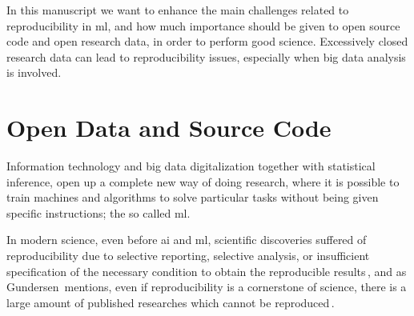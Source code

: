 In this manuscript we want to enhance the main challenges related to reproducibility
in \ac{ml}, and how much importance should be given to open source
code and open research data, in order to perform good science.
Excessively closed research data can lead to reproducibility issues,
especially when big data analysis is involved.

\section{Open Data and Source Code}
%
Information technology and big data digitalization together with statistical inference,
open up a complete new way of doing research, where it is possible to train machines
and algorithms to solve particular tasks without being given specific instructions; the so called
\ac{ml}.

In modern science, even before \ac{ai} and \ac{ml}, scientific discoveries suffered of reproducibility due
to selective reporting, selective analysis, or insufficient specification of the necessary condition to obtain the
reproducible results\,\cite{aarts2016reproducibility}, and as Gundersen\,\cite{gundersen2018state}
mentions, even if reproducibility is a cornerstone of science, there is a large amount of published
researches which cannot be reproduced\,\cite{begley2012drug, begley2015reproducibility, prinz2011believe}.

